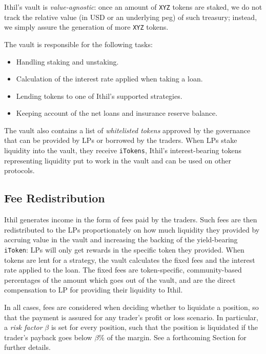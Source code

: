 \documentclass[a4paper,10 pt]{article}
\theoremstyle{definition}
\begin{document}
Ithil's vault is \textit{value-agnostic}: once an amount of \verb|XYZ| tokens are staked, we do not track the relative value (in USD or an underlying peg) of such treasury; instead, we simply assure the generation of more \verb|XYZ| tokens.

The vault is responsible for the following tasks:
\begin{itemize}
\item Handling staking and unstaking.
\item Calculation of the interest rate applied when taking a loan.
\item Lending tokens to one of Ithil’s supported strategies.
\item Keeping account of the net loans and insurance reserve balance.
\end{itemize}

The vault also contains a list of {\it whitelisted tokens} approved by the governance that can be provided by LPs or borrowed by the traders. When LPs stake liquidity into the vault, they receive \verb|iTokens|, Ithil's interest-bearing tokens representing liquidity put to work in the vault and can be used on other protocols.

\subsection{Fee Redistribution}

Ithil generates income in the form of fees paid by the traders. Such fees are then redistributed to the LPs proportionately on how much liquidity they provided by accruing value in the vault and increasing the backing of the yield-bearing \verb|iToken|: LPs will only get rewards in the specific token they provided. When tokens are lent for a strategy, the vault calculates the fixed fees and the interest rate applied to the loan. The fixed fees are token-specific, community-based percentages of the amount which goes out of the vault, and are the direct compensation to LP for providing their liquidity to Ithil. 

In all cases, fees are considered when deciding whether to liquidate a position, so that the payment is assured for any trader's profit or loss scenario. In particular, a \textit{risk factor} $\beta$ is set for every position, such that the position is liquidated if the trader's payback goes below $\beta$\% of the margin. See a forthcoming Section for further details.
\end{document}
